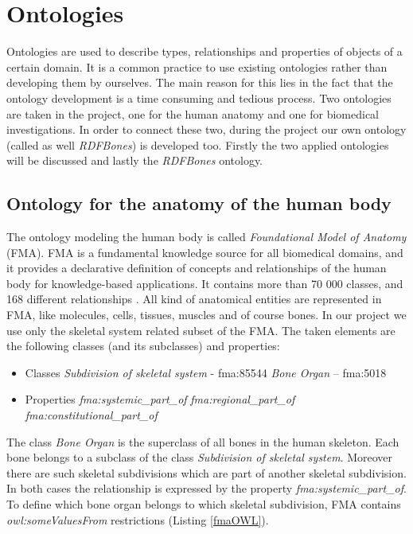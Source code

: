 \section{Ontologies} \label{22}

Ontologies are used to describe types, relationships and properties of objects of a certain domain. It is a common practice to use existing ontologies rather than developing them by ourselves. The main reason for this lies in the fact that the ontology development is a time consuming and tedious process. Two ontologies are taken in the project, one for the human anatomy and one for biomedical investigations. In order to connect these two, during the project our own ontology (called as well \textit{RDFBones}) is developed too. Firstly the two applied ontologies will be discussed and lastly the \textit{RDFBones} ontology.

\subsection{Ontology for the anatomy of the human body}  \label{fma}

The ontology modeling the human body is called \textit{Foundational Model of Anatomy} (FMA). FMA is a fundamental knowledge source for all biomedical domains, and it provides a declarative definition of concepts and relationships of the human body for knowledge-based applications. It contains more than 70 000 classes, and 168 different relationships \cite{Rosse2003478}. All kind of anatomical entities are represented in FMA, like molecules, cells, tissues, muscles and of course bones. In our project we use only the skeletal system related subset of the FMA. The taken elements are the following classes (and its subclasses) and properties: 

\begin{itemize}
	\item{Classes}
		\subitem \textit{Subdivision of skeletal system} - fma:85544 
		\subitem \textit{Bone Organ} – fma:5018
\end{itemize}

\begin{itemize}
	\item{Properties}
		\subitem \textit{fma:systemic\_part\_of}
		\subitem \textit{fma:regional\_part\_of}
		\subitem \textit{fma:constitutional\_part\_of}
\end{itemize}

The class \textit{Bone Organ} is the superclass of all bones in the human skeleton. Each bone belongs to a subclass of  the class \textit{Subdivision of skeletal system}. Moreover there are such skeletal subdivisions which are part of another skeletal subdivision. In both cases the relationship is expressed by the property \textit{fma:systemic\_part\_of}. To define which bone organ belongs to which skeletal subdivision, FMA contains \textit{owl:someValuesFrom} restrictions (Listing \ref{fmaOWL}).

